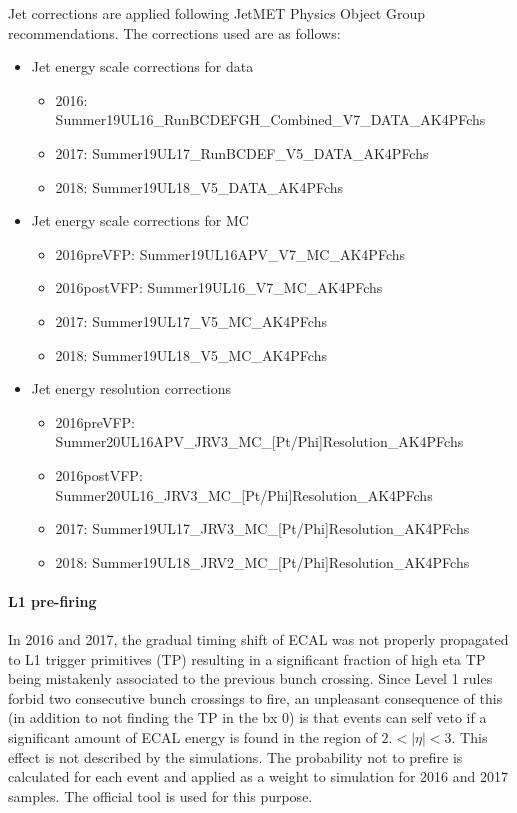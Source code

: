 Jet corrections are applied following JetMET Physics Object Group recommendations. The corrections used are as follows:
\begin{itemize}
\item Jet energy scale corrections for data
\begin{itemize}
\item 2016: Summer19UL16\_RunBCDEFGH\_Combined\_V7\_DATA\_AK4PFchs
\item 2017: Summer19UL17\_RunBCDEF\_V5\_DATA\_AK4PFchs
\item 2018: Summer19UL18\_V5\_DATA\_AK4PFchs
\end{itemize}
\item Jet energy scale corrections for MC
\begin{itemize}
\item 2016preVFP: Summer19UL16APV\_V7\_MC\_AK4PFchs
\item 2016postVFP: Summer19UL16\_V7\_MC\_AK4PFchs
\item 2017: Summer19UL17\_V5\_MC\_AK4PFchs
\item 2018: Summer19UL18\_V5\_MC\_AK4PFchs
\end{itemize}
\item Jet energy resolution corrections
\begin{itemize}
\item 2016preVFP: Summer20UL16APV\_JRV3\_MC\_[Pt/Phi]Resolution\_AK4PFchs
\item 2016postVFP: Summer20UL16\_JRV3\_MC\_[Pt/Phi]Resolution\_AK4PFchs
\item 2017: Summer19UL17\_JRV3\_MC\_[Pt/Phi]Resolution\_AK4PFchs
\item 2018: Summer19UL18\_JRV2\_MC\_[Pt/Phi]Resolution\_AK4PFchs
\end{itemize}
\end{itemize}


\paragraph{L1 pre-firing}

In 2016 and 2017, the gradual timing shift of ECAL was not properly propagated to L1 trigger primitives (TP) resulting in a significant fraction of high eta TP being mistakenly associated to the previous bunch crossing.
Since Level 1 rules forbid two consecutive bunch crossings to fire, an unpleasant consequence of this (in addition to not finding the TP in the bx 0) is that events can self veto if a significant amount of ECAL energy is found in the region of $2.<|\eta|<3$.
This effect is not described by the simulations.%
The probability not to prefire is calculated for each event and applied as a weight to simulation for 2016 and 2017 samples.
The official tool is used for this purpose.%

